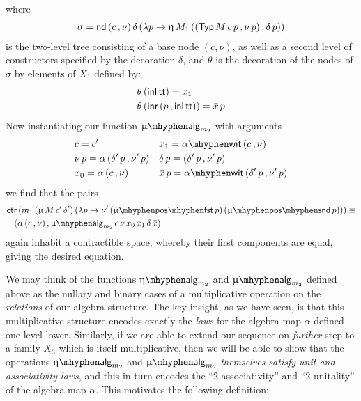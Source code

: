 where
\begin{align*}
  &\sigma = \mathsf{nd}\, (c \,, \nu)\, \delta\, (\lambda p \to \upeta\, M_1\, ((\mathsf{Typ}\, M\, c\, p \,, \nu\, p) \,, \delta\, p)) \\
\end{align*}
is the two-level tree consisting of a base node $(c , \nu)$, as well
as a second level of constructors specified by the decoration
$\delta$, and $\theta$ is the decoration of the nodes
of $\sigma$ by elements of $X_1$ defined by:
\begin{align*}
  &\theta\, (\mathsf{inl}\, \mathsf{tt}) = x_1 \\
  &\theta\, (\mathsf{inr}\, (p \,, \mathsf{inl}\, \mathsf{tt})) = \bar{x}\, p \\
\end{align*}
Now instantiating our function $\upmu\alg_{m_2}$ with arguments
\begin{align*}
  &c = c' &&x_1 = \alpha\mhyphen\mathsf{wit}\, (c \,, \nu) \\
  &\nu\, p = \alpha\, (\delta'\, p \,, \nu'\, p) &&\delta\, p = (\delta'\, p \,, \nu' \, p) \\
  &x_0 = \alpha\, (c \,, \nu) &&\bar{x}\, p = \alpha\mhyphen\mathsf{wit}\, (\delta'\, p \,, \nu'\, p) 
\end{align*}
we find that the pairs
\begin{align*}
  &\ctr (m_1\, (\upmu\, M\, c'\, \delta')\, (\lambda p \to \nu'\, (\muposfst p)\, (\mupossnd p))) \equiv \\
  &\hspace{.3cm} (\alpha\, (c \,, \nu) \,,  \upmu\alg_{m_2}\, c\, \nu\, x_0\, x_1\, \delta\, \bar{x})
\end{align*}
again inhabit a contractible space, whereby their first components are
equal, giving the desired equation.

We may think of the functions $\upeta\alg_{m_2}$ and $\upmu\alg_{m_2}$
defined above as the nullary and binary cases of a multiplicative
operation on the \emph{relations} of our algebra structure.  The key
insight, as we have seen, is that this multiplicative structure
encodes exactly the \emph{laws} for the algebra map $\alpha$ defined
one level lower.  Similarly, if we are able to extend our sequence on
\emph{further} step to a family $X_3$ which is itself multiplicative,
then we will be able to show that the operations $\upeta\alg_{m_2}$
and $\upmu\alg_{m_2}$ \emph{themselves satisfy unit and associativity
  laws}, and this in turn encodes the ``2-associativity'' and
``2-unitality'' of the algebra map $\alpha$.  This motivates
the following definition:

